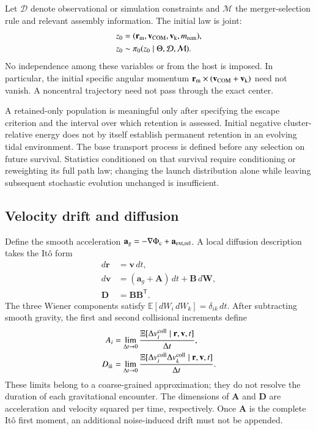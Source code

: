 \documentclass[aps,prd,reprint,amsmath,amssymb,superscriptaddress,nofootinbib,longbibliography,floatfix]{revtex4-2}
\begin{document}
Let $\mathcal D$ denote observational or simulation constraints and $\mathcal M$ the merger-selection rule and relevant assembly information. The initial law is joint:
\begin{align}
z_0&=(\mathbf r_{\rm m},\mathbf v_{\rm COM},
\mathbf v_{\rm k},m_{\rm rem}),\label{eq:initial-state}\\
z_0&\sim\pi_0(z_0\mid\Theta,\mathcal D,\mathcal M).
\label{eq:launch-law}
\end{align}
No independence among these variables or from the host is imposed. In particular, the initial specific angular momentum
$\mathbf r_{\rm m}\times(\mathbf v_{\rm COM}+\mathbf v_{\rm k})$
need not vanish. A noncentral trajectory need not pass through the exact center.

A retained-only population is meaningful only after specifying the escape criterion and the interval over which retention is assessed. Initial negative cluster-relative energy does not by itself establish permanent retention in an evolving tidal environment. The base transport process is defined before any selection on future survival. Statistics conditioned on that survival require conditioning or reweighting its full path law; changing the launch distribution alone while leaving subsequent stochastic evolution unchanged is insufficient.

\subsection{Velocity drift and diffusion}

Define the smooth acceleration
$\mathbf a_g=-\nabla\Phi_{\rm c}+\mathbf a_{\rm ext,rel}$.
A local diffusion description takes the It\^o form
\begin{align}
d\mathbf r&=\mathbf v\,dt,\label{eq:position-sde}\\
d\mathbf v&=(\mathbf a_g+\mathbf A)\,dt+\mathbf B\,d\mathbf W,
\label{eq:velocity-sde}\\
\mathbf D&=\mathbf B\mathbf B^{\mathsf T}.
\label{eq:diffusion-convention}
\end{align}
The three Wiener components satisfy
$\mathbb E[dW_i\,dW_k]=\delta_{ik}\,dt$.
After subtracting smooth gravity, the first and second collisional increments define
\begin{align}
A_i&=\lim_{\Delta t\to0}
\frac{\mathbb E[\Delta v_i^{\rm coll}\mid\mathbf r,\mathbf v,t]}
{\Delta t},\label{eq:drift}\\
D_{ik}&=\lim_{\Delta t\to0}
\frac{\mathbb E[\Delta v_i^{\rm coll}\Delta v_k^{\rm coll}
\mid\mathbf r,\mathbf v,t]}{\Delta t}.
\label{eq:diffusion}
\end{align}
These limits belong to a coarse-grained approximation; they do not resolve the duration of each gravitational encounter. The dimensions of $\mathbf A$ and $\mathbf D$ are acceleration and velocity squared per time, respectively. Once $\mathbf A$ is the complete It\^o first moment, an additional noise-induced drift must not be appended.
\end{document}
